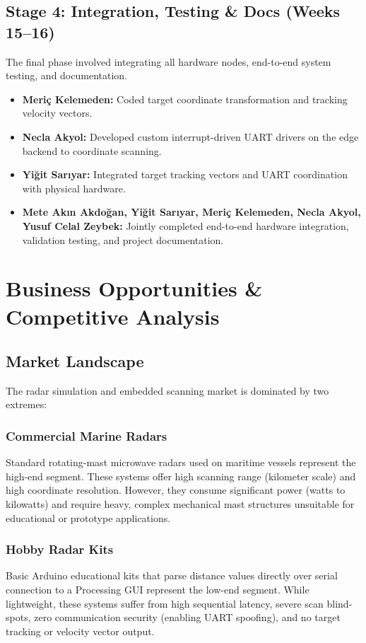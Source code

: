 \documentclass[conference]{IEEEtran}
\begin{document}
\subsection{Stage 4: Integration, Testing \& Docs (Weeks 15--16)}
The final phase involved integrating all hardware nodes, end-to-end system testing, and documentation.
\begin{itemize}
    \item \textbf{Meri\c{c} Kelemeden:} Coded target coordinate transformation and tracking velocity vectors.
    \item \textbf{Necla Akyol:} Developed custom interrupt-driven UART drivers on the edge backend to coordinate scanning.
    \item \textbf{Yi\u{g}it Sar{\i}yar:} Integrated target tracking vectors and UART coordination with physical hardware.
    \item \textbf{Mete Ak{\i}n Akdo\u{g}an, Yi\u{g}it Sar{\i}yar, Meri\c{c} Kelemeden, Necla Akyol, Yusuf Celal Zeybek:} Jointly completed end-to-end hardware integration, validation testing, and project documentation.
\end{itemize}


\section{Business Opportunities \& Competitive Analysis}
\label{sec:business}

\subsection{Market Landscape}
The radar simulation and embedded scanning market is dominated by two extremes:

\subsubsection{Commercial Marine Radars}
Standard rotating-mast microwave radars used on maritime vessels represent the high-end segment. These systems offer high scanning range (kilometer scale) and high coordinate resolution. However, they consume significant power (watts to kilowatts) and require heavy, complex mechanical mast structures unsuitable for educational or prototype applications.

\subsubsection{Hobby Radar Kits}
Basic Arduino educational kits that parse distance values directly over serial connection to a Processing GUI represent the low-end segment. While lightweight, these systems suffer from high sequential latency, severe scan blind-spots, zero communication security (enabling UART spoofing), and no target tracking or velocity vector output.
\end{document}
